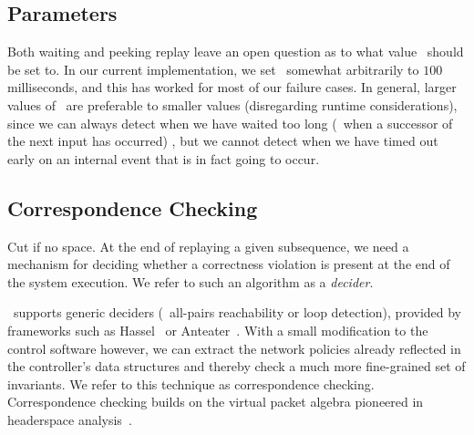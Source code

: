 \subsection{Parameters}
\label{subsec:params}

Both waiting and peeking replay leave an open question as to what value
\textepsilon~should be set to. In our current implementation,
we set \textepsilon~\num{somewhat arbitrarily} to $100$ milliseconds, and this has worked for \num{most} of our
failure cases. In general, larger values of \textepsilon~are preferable to
smaller values (disregarding runtime considerations), since we can always
detect when we have waited too long (\viz~when a successor of the next input
has occurred) , but we cannot detect when we have timed out
early on an internal event that is in fact going to occur.


 

\subsection{Correspondence Checking}
\label{subsec:cc}

\num{Cut if no space.}
At the end of replaying a given subsequence, we need a mechanism for deciding
whether a correctness violation is present at the end of the system execution.
We refer to such an algorithm as a {\em decider}.

\Simulator~supports generic deciders (\eg~all-pairs reachability or loop detection),
provided by frameworks such as Hassel~\cite{hsa,hsa_realtime} or
Anteater~\cite{anteater,khurshid2012veriflow}.
With a small modification to the control software however, we can
extract the network policies already reflected in the
controller's data structures and thereby check a much more fine-grained set of invariants.
We refer to this technique as correspondence checking. Correspondence checking
builds on the virtual packet algebra
pioneered in headerspace analysis~\cite{hsa}.

